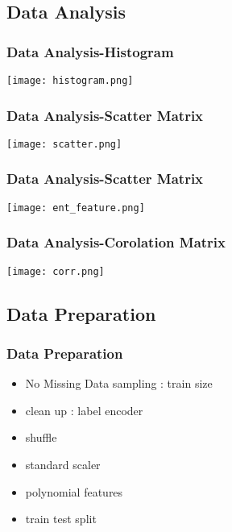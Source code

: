 \documentclass[11pt]{beamer}
\begin{document}
\subsection{Data Analysis}
\begin{frame}
\frametitle{Data Analysis-Histogram}

\texttt{[image: histogram.png]}
\end{frame}


\begin{frame}
\frametitle{Data Analysis-Scatter Matrix}

\texttt{[image: scatter.png]}

\end{frame}


\begin{frame}
\frametitle{Data Analysis-Scatter Matrix}

\texttt{[image: ent\_feature.png]}

\end{frame}


\begin{frame}
\frametitle{Data Analysis-Corolation Matrix}
\texttt{[image: corr.png]}
\end{frame}

\subsection{Data Preparation}
\begin{frame}
\frametitle{Data Preparation}

\begin{itemize}
 \item No Missing Data
 \itme sampling : train size
 \item clean up : label encoder
 \item shuffle
 \item standard scaler
 \item polynomial features
 \item train test split
\end{itemize}

\end{frame}
\end{document}
